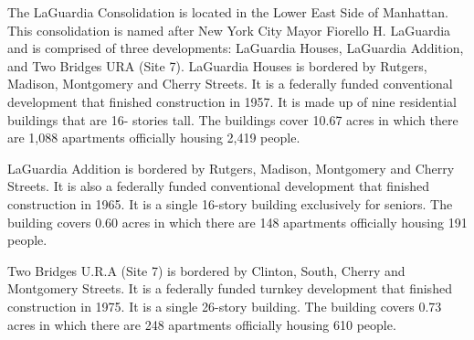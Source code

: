 The LaGuardia Consolidation is located in the Lower East Side of Manhattan. This consolidation is named after New York City Mayor Fiorello H. LaGuardia and is comprised of three developments: LaGuardia Houses, LaGuardia Addition, and Two Bridges URA (Site 7). LaGuardia Houses is bordered by Rutgers, Madison, Montgomery and Cherry Streets. It is a federally funded conventional development that finished construction in 1957. It is made up of nine residential buildings that are 16- stories tall. The buildings cover 10.67 acres in which there are 1,088 apartments officially housing 2,419 people.    \par \vspace{.7\baselineskip}   \par \vspace{.7\baselineskip}LaGuardia Addition is bordered by Rutgers, Madison, Montgomery and Cherry Streets. It is also a federally funded conventional development that finished construction in 1965. It is a single 16-story building exclusively for seniors. The building covers 0.60 acres in which there are 148 apartments officially housing 191 people.    \par \vspace{.7\baselineskip}Two Bridges U.R.A (Site 7) is bordered by Clinton, South, Cherry and Montgomery Streets. It is a federally funded turnkey development that finished construction in 1975. It is a single 26-story building. The building covers 0.73 acres in which there are 248 apartments officially housing 610 people.